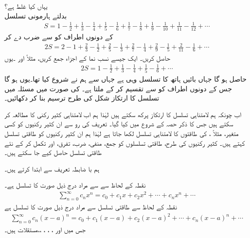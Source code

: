 یہاں کیا غلط ہے؟\\
بدلتے ہارمونی تسلسل
\begin{align*}
S=1-\frac{1}{2}+\frac{1}{3}-\frac{1}{4}+\frac{1}{5}-\frac{1}{6}+\frac{1}{7}-\frac{1}{8}+\frac{1}{9}-\frac{1}{10}+\frac{1}{11}-\frac{1}{12}+\cdots
\end{align*}
کے دونوں اطراف کو  سے ضرب دے کر
\begin{align*}
2S=2-1+\frac{2}{3}-\frac{1}{2}+\frac{2}{5}-\frac{1}{3}+\frac{2}{7}-\frac{1}{4}+\frac{2}{9}-\frac{1}{5}+\frac{2}{11}-\frac{1}{6}+\cdots
\end{align*}
حاصل کریں۔ ایک جیسے  نسب نما کے اجزاء جمع کریں، مثلاً  اور ۔یوں
\begin{align*}
2S=1-\frac{1}{2}+\frac{1}{3}-\frac{1}{4}+\frac{1}{5}-\frac{1}{6}+\cdots
\end{align*}
حاصل ہو گا جہاں بائیں ہاتھ کا تسلسل وہی ہے جہاں سے ہم نے شروع کیا تھا۔یوں  ہو گا جس کے دونوں اطراف کو  سے تقسیم کر کے  ملتا ہے۔
 کی صورت میں مسئلہ  میں تسلسل کا ارتکاز شکل  کی طرح   ترسیم بنا کر دکھائیں۔



اب چونکہ ہم لامتناہی تسلسل کا ارتکاز پرکھ سکتے ہیں لہٰذا ہم اب لامتناہی کثیر رکنی کا مطالعہ کر سکتے ہیں جس  کا ذکر حصہ  کے  شروع میں کیا گیا۔ تعریف کی رو سے ان کثیر رکنیوں کو کسی متغیر، مثلاً ،  کی طاقتوں کا لامتناہی تسلسل لکھا جاتا ہے لہٰذا ہم ان کثیر رکنیوں کو طاقتی تسلسل کہتے ہیں۔ کثیر رکنیوں کی طرح، طاقتی تسلسلوں کو جمع، منفی، ضرب، تفرق،  اور تکمل کر کے نئے طاقتی تسلسل حاصل کیے جا سکتے ہیں۔

ہم با ضابطہ تعریف سے ابتدا کرتے ہیں۔

نقطہ  کے لحاظ سے  سے مراد درج ذیل صورت کا تسلسل ہے۔
\begin{align}\label{مساوات_تسلسل_تعریف_طاقتی_الف}
\sum_{n=0}^{\infty}c_nx^n=c_0+c_1x+c_2x^2+\cdots+c_nx^n+\cdots
\end{align}
نقطہ  کے لحاظ سے طاقتی تسلسل سے مراد درج ذیل صورت کا تسلسل ہے
\begin{align}\label{مساوات_تسلسل_تعریف_طاقتی_ب}
\sum_{n=0}^{\infty}c_n(x-a)^n=c_0+c_1(x-a)+c_2(x-a)^2+\cdots+c_n(x-a)^n+\cdots
\end{align}
جس میں   اور  ، ، ، ،، مستقلات  ہیں۔

